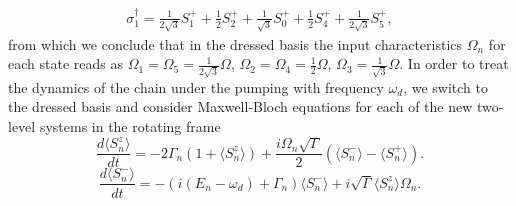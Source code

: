 \documentclass[%
 aps, pra,
 amsmath,amssymb,
 preprint,%
superscriptaddress
]{revtex4-2}
\begin{document}
\begin{eqnarray}
\sigma_1^{\dagger}=\frac{1}{2\sqrt{3}}S_1^{+} + \frac{1}{2}S_2^{+} + \frac{1}{\sqrt{3}}S_0^{+} + \frac{1}{2}S_4^{+} + \frac{1}{2\sqrt{3}}S_5^{+},
\label{sigma1}
\end{eqnarray}
from which we conclude that in the dressed basis the input
characteristics $\Omega_{n}$ for each state reads as $\Omega_{1}=\Omega_{5}=\frac{1}{2\sqrt{3}}\Omega$, $\Omega_{2}=\Omega_{4}=\frac{1}{2}\Omega$, $\Omega_{3}=\frac{1}{\sqrt{3}}\Omega$. In order to treat the dynamics of the chain under the pumping with frequency $\omega_d$,
we switch to the
dressed basis and consider Maxwell-Bloch equations for each of the new
two-level systems in the rotating frame
\begin{equation}
\frac{d \langle S_n^{z} \rangle}{dt} = -2\Gamma_n \left(1+
\langle S_n^{z} \rangle \right) +  \frac{i \Omega_n \sqrt{\Gamma}}{2}
\left(\langle S_n^{-} \rangle  -
\langle S_n^{+} \rangle \right). \label{sigmaz}
\end{equation}
\begin{equation}
\frac{d \langle S_n^{-} \rangle}{dt} = -\left(i (E_n-\omega_d) +
\Gamma_n\right) \langle S_n^{-} \rangle + i
\sqrt{\Gamma} \langle S_n^{z} \rangle \Omega_n.
\label{sigmaminus}
\end{equation}
\end{document}
